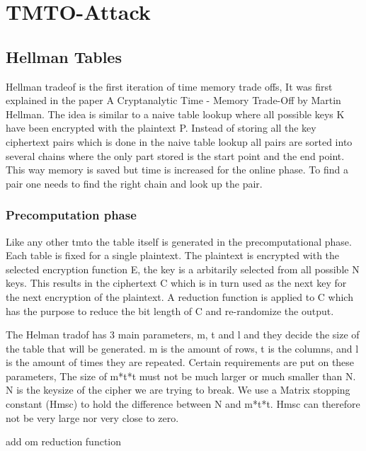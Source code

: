 \chapter{TMTO-Attack}

\label{ch:tmto}

\newpage
\section{Hellman Tables}
Hellman tradeof is the first iteration of time memory trade offs, It was first explained in the paper A Cryptanalytic Time - Memory Trade-Off by Martin Hellman.
The idea is similar to a naive table lookup where all possible keys K have been encrypted with the plaintext P. Instead of storing all the key ciphertext pairs which is done in the naive table lookup all pairs are sorted into several chains where the only part stored is the start point and the end point. This way memory is saved but time is increased for the online phase. To find a pair one needs to find the right chain and look up the pair.


\subsection*{Precomputation phase}
Like any other tmto the table itself is generated in the precomputational phase. Each table is fixed for a single plaintext. The plaintext is encrypted with the selected encryption function E, the key is a arbitarily selected from all possible N keys. This results in the ciphertext C which is in turn used as the next key for the next encryption of the plaintext. A reduction function is applied to C which has the purpose to reduce the bit length of C and re-randomize the output.

The Helman tradof has 3 main parameters, m, t and l and they decide the size of the table that will be generated.
m is the amount of rows, t is the columns, and l is the amount of times they are repeated.
Certain requirements are put on these parameters, The size of m*t*t must not be much larger or much smaller than N.
N is the keysize of the cipher we are trying to break. We use a Matrix stopping constant (Hmsc) to hold the difference between N and m*t*t. Hmsc can therefore not be very large nor very close to zero.

add om reduction function

